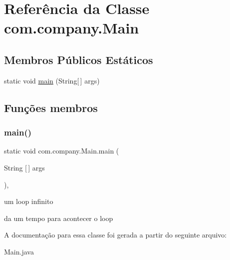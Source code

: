 \hypertarget{classcom_1_1company_1_1_main}{}\section{Referência da Classe com.\+company.\+Main}
\label{classcom_1_1company_1_1_main}
\subsection*{Membros Públicos Estáticos}
\begin{DoxyCompactItemize}
\item 
static void \mbox{\hyperlink{classcom_1_1company_1_1_main_a6bc3d68479e38e54554042566ab5e157}{main}} (String\mbox{[}$\,$\mbox{]} args)
\end{DoxyCompactItemize}


\subsection{Funções membros}
\mbox{\label{classcom_1_1company_1_1_main_a6bc3d68479e38e54554042566ab5e157}} 
\subsubsection{\texorpdfstring{main()}{main()}}
{\footnotesize\ttfamily static void com.\+company.\+Main.\+main (\begin{DoxyParamCaption}\item[{String \mbox{[}$\,$\mbox{]}}]{args }\end{DoxyParamCaption})\hspace{0.3cm}{\ttfamily [inline]}, {\ttfamily [static]}}

um loop infinito

da um tempo para acontecer o loop 

A documentação para essa classe foi gerada a partir do seguinte arquivo\+:\begin{DoxyCompactItemize}
\item 
Main.\+java\end{DoxyCompactItemize}
